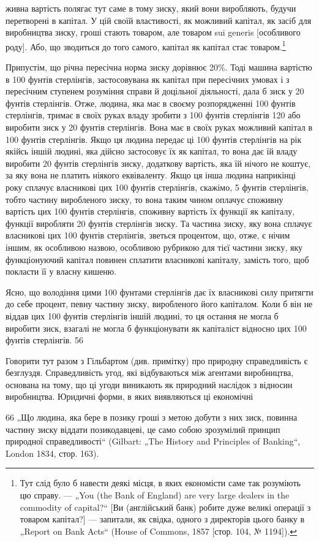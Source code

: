 живна вартість полягає тут саме в тому зиску, який вони виробляють,
будучи перетворені в капітал. У цій своїй властивості,
як можливий капітал, як засіб для виробництва зиску, гроші
стають товаром, але товаром sui generis [особливого роду].
Або, що зводиться до того самого, капітал як капітал стає
товаром.\footnote{
Тут слід було б навести деякі місця, в яких економісти саме так розуміють
цю справу. — „You (the Bank of England) are very large dealers in the
commodity of capital?“ [Ви (англійський банк) робите дуже великі операції
з товаром капітал?] — запитали, як свідка, одного з директорів цього банку
в „Report on Bank Acts“ (House of Commons, 1857 [стор. 104, № 1194]).
}

Припустім, що річна пересічна норма зиску дорівнює 20\%.
Тоді машина вартістю в 100 фунтів стерлінгів, застосовувана
як капітал при пересічних умовах і з пересічним ступенем розуміння
справи й доцільної діяльності, дала б зиск у 20 фунтів
стерлінгів. Отже, людина, яка має в своєму розпорядженні
100 фунтів стерлінгів, тримає в своїх руках владу зробити
з 100 фунтів стерлінгів 120 або виробити зиск у 20 фунтів стерлінгів.
Вона має в своїх руках можливий капітал в 100 фунтів
стерлінгів. Якщо ця людина передає ці 100 фунтів стерлінгів
на рік якійсь іншій людині, яка дійсно застосовує їх як капітал,
то вона дає їй владу виробити 20 фунтів стерлінгів зиску, додаткову
вартість, яка їй нічого не коштує, за яку вона не платить
ніякого еквіваленту. Якщо ця інша людина наприкінці
року сплачує власникові цих 100 фунтів стерлінгів, скажімо,
5 фунтів стерлінгів, тобто частину виробленого зиску, то вона
таким чином оплачує споживну вартість цих 100 фунтів стерлінгів,
споживну вартість їх функції як капіталу, функції виробляти
20 фунтів стерлінгів зиску. Та частина зиску, яку вона
сплачує власникові цих 100 фунтів стерлінгів, зветься процентом,
що, отже, є нічим іншим, як особливою назвою, особливою
рубрикою для тієї частини зиску, яку функціонуючий капітал
повинен сплатити власникові капіталу, замість того, щоб покласти
її у власну кишеню.

Ясно, що володіння цими 100 фунтами стерлінгів дає їх
власникові силу притягти до себе процент, певну частину
зиску, виробленого його капіталом. Коли б він не віддав цих
100 фунтів стерлінгів іншій людині, то ця остання не могла б
виробити зиск, взагалі не могла б функціонувати як капіталіст
відносно цих 100 фунтів стерлінгів. 56

Говорити тут разом з Гільбартом (див. примітку) про природну
справедливість є безглуздя. Справедливість угод, які
відбуваються між агентами виробництва, основана на тому, що
ці угоди виникають як природний наслідок з відносин виробництва.
Юридичні форми, в яких виявляються ці економічні

66 „Що людина, яка бере в позику гроші з метою добути з них зиск, повинна
частину зиску віддати позикодавцеві, це само собою зрозумілий принцип
природної справедливості“ (Gilbart: „The History and Principles of Banking“,
London 1834, стор. 163).
